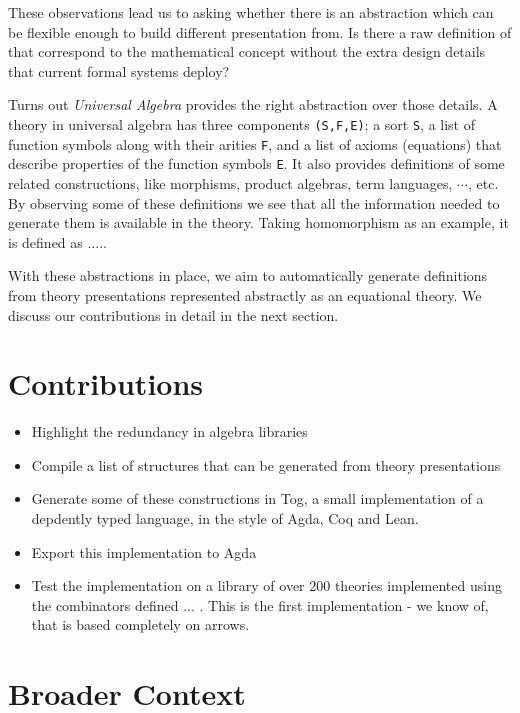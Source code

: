 These observations lead us to asking whether there is an abstraction which can be flexible enough to build different presentation from. Is there a raw definition of \monoid that correspond to the mathematical concept without the extra design details that current formal systems deploy? 

Turns out \emph{Universal Algebra} provides the right abstraction over those details. A theory in universal algebra has three components \verb|(S,F,E)|; a sort \verb|S|, a list of function symbols along with their arities \verb|F|, and a list of axioms (equations) that describe properties of the function symbols \verb|E|. It also provides definitions of some related constructions, like morphisms, product algebras, term languages, $\cdots$, etc. By observing some of these definitions we see that all the information needed to generate them is available in the theory. Taking homomorphism as an example, it is defined as ..... 

With these abstractions in place, we aim to automatically generate definitions from theory presentations represented abstractly as an equational theory. We discuss our contributions in detail in the next section. 

\section{Contributions}
\begin{itemize}
    \item Highlight the redundancy in algebra libraries 
    \item Compile a list of structures that can be generated from theory presentations
    \item Generate some of these constructions in Tog, a small implementation of a depdently typed language, in the style of Agda, Coq and Lean. 
    \item Export this implementation to Agda 
    \item Test the implementation on a library of over $200$ theories implemented using the combinators defined ... . This is the first implementation - we know of, that is based completely on arrows. 
\end{itemize}  

\section{Broader Context}

